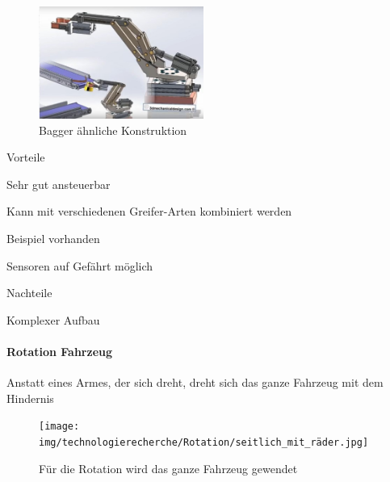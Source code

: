 \documentclass[../main.tex]{subfiles}
\begin{document}
\begin{figure}[h!]
        \centering
        \includegraphics[width=0.48\textwidth]{img/technologierecherche/Rotation/kran.jpg}
        \caption[Bagger ähnliche Konstruktion]{Bagger ähnliche Konstruktion \footnotemark} 
        \label{img:tech_kran}
\end{figure}

\begin{minipage}[t]{0.48\textwidth}
    \begin{items}
          \item [Vorteile]
          \item Sehr gut ansteuerbar
          \item Kann mit verschiedenen Greifer-Arten kombiniert werden
          \item Beispiel vorhanden
          \item Sensoren auf Gefährt möglich
    \end{items}
\end{minipage}
\hfill
\begin{minipage}[t]{0.48\textwidth}
    \begin{items}
          \item [Nachteile]
          \item Komplexer Aufbau
    \end{items}
\end{minipage}
\newpage
\paragraph{Rotation Fahrzeug}
Anstatt eines Armes, der sich dreht, dreht sich das ganze Fahrzeug mit dem Hindernis

\begin{figure}[h!]
        \centering
        \texttt{[image: img/technologierecherche/Rotation/seitlich\_mit\_räder.jpg]}
        \caption{Für die Rotation wird das ganze Fahrzeug gewendet}
        \label{img:tech_seitlich_mit_räder}
\end{figure}
\end{document}
